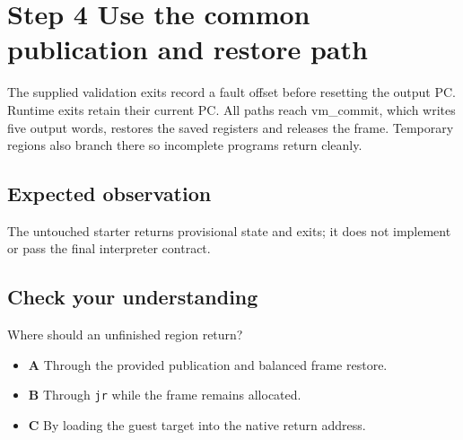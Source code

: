 \section{Step 4 Use the common publication and restore path}\label{vm-s04}

The supplied validation exits record a fault offset before resetting the output PC. Runtime exits retain their current PC. All paths reach vm\_commit, which writes five output words, restores the saved registers and releases the frame. Temporary regions also branch there so incomplete programs return cleanly.

\subsection{Expected observation}
The untouched starter returns provisional state and exits; it does not implement or pass the final interpreter contract.

\subsection{Check your understanding}
Where should an unfinished region return?

\begin{itemize}
  \item \textbf{A} Through the provided publication and balanced frame restore.
  \item \textbf{B} Through \texttt{jr} while the frame remains allocated.
  \item \textbf{C} By loading the guest target into the native return address.
\end{itemize}

